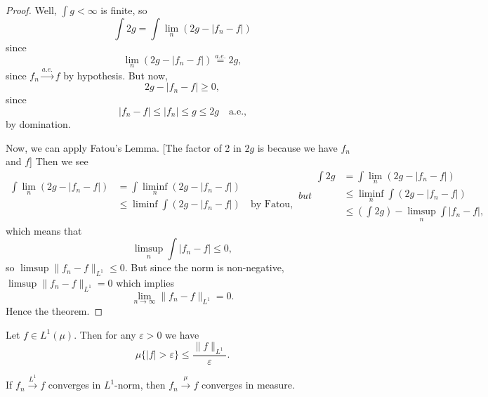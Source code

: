\begin{proof}
Well, $\int g<\infty$ is finite, so
\begin{equation}
\int 2g=\int\lim_{n}(2g-|f_{n}-f|)
\end{equation}
since
\begin{equation}
\lim_{n}(2g-|f_{n}-f|)\stackrel{a.e.}{=}2g,
\end{equation}
since $f_{n}\xrightarrow{a.e.}f$ by hypothesis.
But now,
\begin{equation}
2g-|f_{n}-f|\geq0,
\end{equation}
since
\begin{equation}
|f_{n}-f|\leq|f_{n}|\leq g\leq 2g\quad\mbox{a.e.,}
\end{equation}
by domination.

Now, we can apply Fatou's Lemma. [The factor of 2 in $2g$ is because
we have $f_{n}$ and $f$]
Then we see
\begin{subequations}
  \begin{align}
\int\lim_{n}(2g-|f_{n}-f|) &= \int\liminf_{n}(2g-|f_{n}-f|)\\
&\leq\liminf\int(2g-|f_{n}-f|)\quad\mbox{by Fatou},
  \end{align}
  but
  \begin{align}
\int2g &= \int\lim_{n}(2g-|f_{n}-f|) \\
&\leq \liminf_{n}\int(2g-|f_{n}-f|)\\
&\leq(\int2g)-\limsup_{n}\int|f_{n}-f|,
  \end{align}
\end{subequations}
which means that
\begin{equation}
\limsup_{n}\int|f_{n}-f|\leq0,
\end{equation}
so $\limsup\|f_{n}-f\|_{L^{1}}\leq0$. But since the norm is non-negative,
$\limsup\|f_{n}-f\|_{L^{1}}=0$ which implies
\begin{equation}
\lim_{n\to\infty}\|f_{n}-f\|_{L^{1}}=0.
\end{equation}
Hence the theorem.
\end{proof}

\begin{fact}
Let $f\in L^{1}(\mu)$. Then for any $\varepsilon>0$ we have
\begin{equation}
\mu\{|f|>\varepsilon\}\leq\frac{\|f\|_{L^{1}}}{\varepsilon}.
\end{equation}
\end{fact}

\begin{proposition}
If $f_{n}\xrightarrow{L^{1}}f$ converges in $L^{1}$-norm,
then $f_{n}\xrightarrow{\mu}f$ converges in measure.
\end{proposition}


